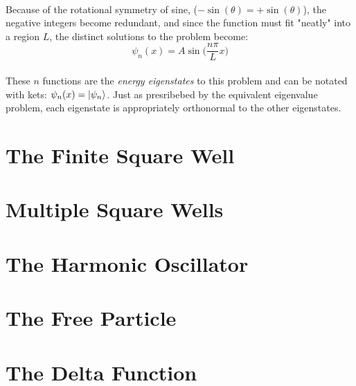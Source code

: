 \documentclass[12pt,letterpaper]{book}
\begin{document}
\paragraph*{}Because of the rotational symmetry of sine, ($-\sin(\theta) = +\sin(\theta)$), the negative integers become redundant, and since the function must fit "neatly" into a region $L$, the distinct solutions to the problem become:
\begin{equation}
\label{ISW spatial solution}
\psi_n(x) = A\sin \Big( \frac{n\pi}{L}x \Big)
\end{equation}
\paragraph*{}These $n$ functions are the \textit{energy eigenstates} to this problem and can be notated with kets: $\psi_n(x) = \ket{\psi_n}$. Just as presribebed by the equivalent eigenvalue problem, each eigenstate is appropriately orthonormal to the other eigenstates. 


\section{The Finite Square Well}


\section{Multiple Square Wells}



\section{The Harmonic Oscillator}



\section{The Free Particle}



\section{The Delta Function}
\end{document}

